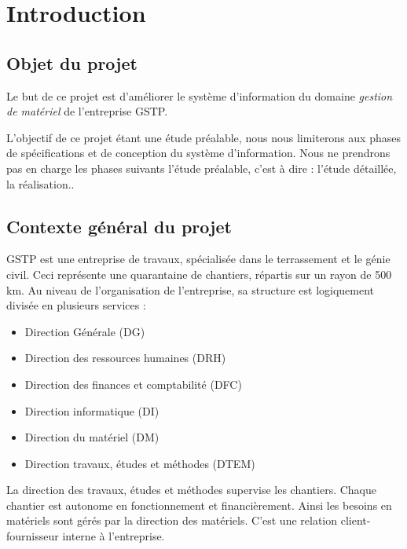 \section{Introduction}

\subsection{Objet du projet}

Le but de ce projet est d’améliorer le système d’information du domaine \emph{gestion de matériel} de l’entreprise GSTP.

L’objectif de ce projet étant une étude préalable, nous nous limiterons aux phases de spécifications et de conception du système d’information. Nous ne prendrons pas en charge les phases suivants l’étude préalable, c’est à dire : l’étude détaillée, la réalisation..

\subsection{Contexte général du projet}
GSTP est une entreprise de travaux, spécialisée dans le terrassement et le génie civil.
Ceci représente une quarantaine de chantiers, répartis sur un rayon de 500 km.
Au niveau de l’organisation de l’entreprise, sa structure est logiquement divisée en plusieurs services :
\begin{itemize}
    \item Direction Générale (DG)
    \item Direction des ressources humaines (DRH)
    \item Direction des finances et comptabilité (DFC)
    \item Direction informatique (DI)
    \item Direction du matériel (DM)
    \item Direction travaux, études et méthodes (DTEM)
\end{itemize}
La direction des travaux, études et méthodes supervise les chantiers. Chaque chantier est autonome en fonctionnement et financièrement. Ainsi les besoins en matériels sont gérés par la direction des matériels. C’est une relation client-fournisseur interne à l’entreprise.


